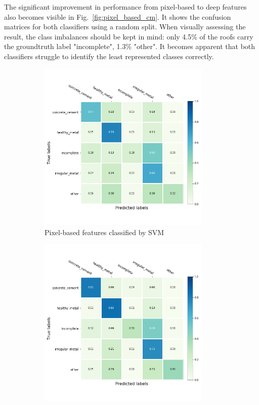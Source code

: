 \documentclass[11pt]{article}
\begin{document}
	The significant improvement in performance from pixel-based to deep features also becomes visible in Fig.~\ref{fig:pixel_based_cm}. It shows the confusion matrices for both classifiers using a random split. When visually assessing the result, the class imbalances should be kept in mind: only 4.5\% of the roofs carry the groundtruth label "incomplete", 1.3\% "other". It becomes apparent that both classifiers struggle to identify the least represented classes correctly.
	
	\begin{figure}
		\begin{subfigure}[t]{.5\textwidth}
			\centering
			\includegraphics[width=0.9\textwidth]{figures/results/pixel_based_cm.png}
			\caption{Pixel-based features classified by SVM}
		\end{subfigure}
		\begin{subfigure}[t]{.5\textwidth}
			\centering
			\includegraphics[width=0.9\textwidth]{figures/results/nn_based_cm_svm.png}

\end{subfigure}
\end{figure}
\end{document}
